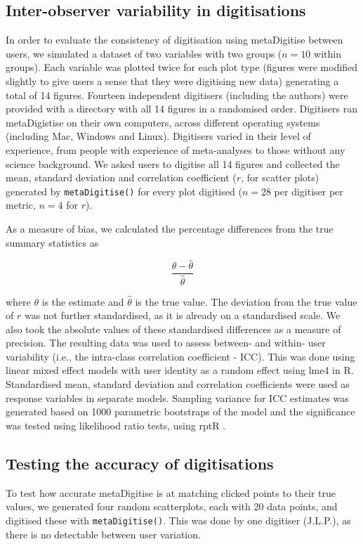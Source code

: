 \documentclass[12pt]{article}
\newcommand{\fct}[1]{\texttt{#1()}}
\newcommand{\pkg}[1]{{\fontseries{b}\selectfont #1}}
\let\proglang=\textsf
\begin{document}
\subsection{Inter-observer variability in digitisations}
In order to evaluate the consistency of digitisation using \pkg{metaDigitise} between users, we simulated a dataset of two variables with two groups ($n=10$ within groups). Each variable was plotted twice for each plot type (figures were modified slightly to give users a sense that they were digitising new data) generating a total of 14 figures. Fourteen independent digitisers (including the authors) were provided with a directory with all 14 figures in a randomised order. Digitisers ran \pkg{metaDigistise} on their own computers, across different operating systems (including Mac, Windows and Linux). Digitisers varied in their level of experience, from people with experience of meta-analyses to those without any science background. We asked users to digitise all 14 figures and collected the mean, standard deviation and correlation coefficient ($r$, for scatter plots) generated by \fct{metaDigitise} for every plot digitised ($n=28$ per digitiser per metric, $n=4$ for $r$). 

As a measure of bias, we calculated the percentage differences from the true summary statistics as

\begin{equation}
\frac{\theta - \hat{\theta}}{\hat{\theta}}
\end{equation}

where $\theta$ is the estimate and $\hat{\theta}$ is the true value. The deviation from the true value of $r$ was not further standardised, as it is already on a standardised scale. We also took the absolute values of these standardised differences as a measure of precision. The resulting data was used to assess between- and within- user variability (i.e., the intra-class correlation coefficient - ICC). This was done using linear mixed effect models with user identity as a random effect using \pkg{lme4} \citep{bates2015} in \proglang{R}. Standardised mean, standard deviation and correlation coefficients were used as response variables in separate models. Sampling variance for ICC estimates was generated based on 1000 parametric bootstraps of the model and the significance was tested using likelihood ratio tests, using \pkg{rptR} \citep{stoffel2017}.  


\subsection{Testing the accuracy of digitisations}
To test how accurate \pkg{metaDigitise} is at matching clicked points to their true values, we generated four random scatterplots, each with 20 data points, and digitised these with \fct{metaDigitise}. This was done by one digitiser (J.L.P.), as there is no detectable between user variation.
\end{document}
